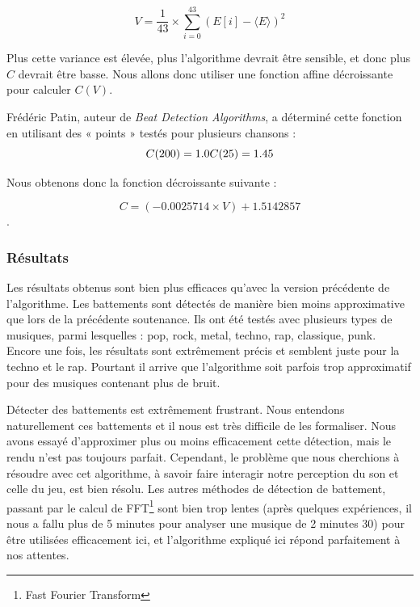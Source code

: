 $$V = \frac{1}{43} \times \sum_{i=0}^{43} (E[i] - \langle E \rangle)^2$$

\par Plus cette variance est élevée, plus l'algorithme devrait être sensible, et donc plus $C$ devrait être basse.
Nous allons donc utiliser une fonction affine décroissante pour calculer $C(V)$.

\par Frédéric Patin, auteur de \emph{Beat Detection Algorithms}, a déterminé cette fonction en utilisant des « points » testés pour plusieurs chansons :
$$
C(200) = 1.0\\
C(25) = 1.45\\
$$

\par Nous obtenons donc la fonction décroissante suivante :

$$C = (-0.0025714 \times V) + 1.5142857$$.

\subsubsection{Résultats}
\par Les résultats obtenus sont bien plus efficaces qu'avec la version précédente de l'algorithme. Les battements sont détectés de manière
bien moins approximative que lors de la précédente soutenance. Ils ont été testés avec plusieurs types de musiques,
parmi lesquelles : pop, rock, metal, techno, rap, classique, punk. Encore une fois, les résultats sont extrêmement précis et
semblent juste pour la techno et le rap. Pourtant il arrive que l'algorithme soit parfois trop approximatif pour des musiques
contenant plus de bruit.

\par Détecter des battements est extrêmement frustrant. Nous entendons naturellement ces battements et il nous est très difficile
de les formaliser. Nous avons essayé d'approximer plus ou moins efficacement cette détection, mais le rendu n'est pas
toujours parfait. Cependant, le problème que nous cherchions à résoudre avec cet algorithme, à savoir faire interagir notre perception
du son et celle du jeu, est bien résolu. Les autres méthodes de détection de battement,
passant par le calcul de FFT\footnote{Fast Fourier Transform} sont bien trop lentes (après quelques expériences, il nous a 
fallu plus de 5 minutes pour analyser une musique de 2 minutes 30) pour être utilisées efficacement ici, et l'algorithme expliqué ici
répond parfaitement à nos attentes.

